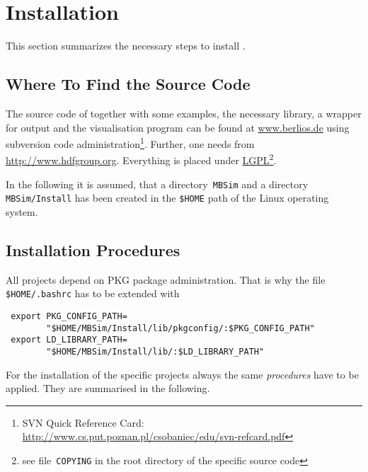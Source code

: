 \section{Installation}
This section summarizes the necessary steps to install \MBSim{} \cite{Foer06}.

\subsection{Where To Find the Source Code}
The source code of \MBSim{} together with some examples, the necessary \FMatVec{} library, a \HDF{} wrapper for output and the visualisation program \OpenMBV{} can be found at \url{www.berlios.de} using subversion code administration\footnote{SVN Quick Reference Card: \url{http://www.cs.put.poznan.pl/csobaniec/edu/svn-refcard.pdf}}. Further, one needs \HDF{} from \url{http://www.hdfgroup.org}. Everything is placed under \href{http://www.gnu.org/licenses/lgpl.html}{LGPL}\footnote{see file~\texttt{COPYING} in the root directory of the specific source code}.\par
In the following it is assumed, that a directory~\texttt{MBSim} and a directory \texttt{MBSim/Install} has been created in the \texttt{\$HOME} path of the Linux operating system. 

\subsection{Installation Procedures}
All projects depend on PKG package administration. That is why the file \texttt{\$HOME/.bashrc} has to be extended with
\begin{verbatim}
 export PKG_CONFIG_PATH=
        "$HOME/MBSim/Install/lib/pkgconfig/:$PKG_CONFIG_PATH"
 export LD_LIBRARY_PATH=
        "$HOME/MBSim/Install/lib/:$LD_LIBRARY_PATH"
\end{verbatim}
For the installation of the specific projects always the same \emph{procedures} have to be applied. They are summarised in the following.

